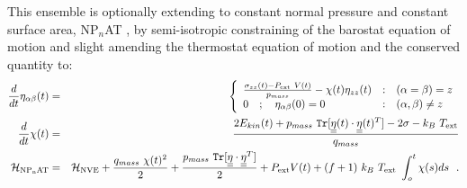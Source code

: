 This ensemble is optionally extending to constant normal pressure
and constant surface area, NP$_{n}$AT \cite{ikeguchi-04a}, by semi-isotropic
constraining of the barostat equation of motion and slight amending
the thermostat equation of motion and the conserved quantity to:
\begin{eqnarray}
\frac{d}{dt} \eta_{\alpha\beta}(t) &=& \left\{ \begin{array} {l@{\quad:\quad}l}
\frac{\sigma_{zz}(t) - P_{\rm ext}~V(t)}{p_{mass}} -
\chi(t) \eta_{zz}(t) & (\alpha = \beta) = z \\
0~~~;~~~\eta_{\alpha\beta}(0) = 0 & (\alpha,\beta) \ne z
\end{array} \right. \nonumber \\
\frac{d}{dt} \chi(t) &=& \frac{2 E_{kin}(t) + p_{mass}~{\tt Tr}[\mat{\eta}(t) \cdot
\mat{\eta}(t)^{T}] - 2 \sigma - k_{B}~T_{\rm ext}}{q_{mass}} \\
{\cal H}_{\rm NP_{n}AT} &=& {\cal H}_{\rm NVE} + {q_{mass}~\chi (t)^{2} \over 2} +
{p_{mass}~{\tt Tr}[\mat{\eta} \cdot \mat{\eta}^{T}] \over 2} + P_{\rm ext} V(t) +
(f+1)~k_{B}~T_{\rm ext}~\int_o^t \chi (s) ds~~. \nonumber
\end{eqnarray}

